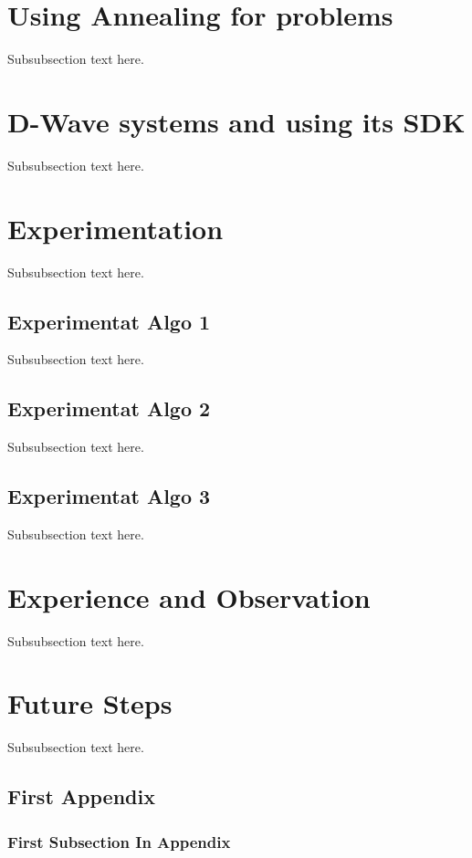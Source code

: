 \documentclass[12pt,conference]{IEEEtran}
\begin{document}
\section{Using Annealing for problems}
Subsubsection text here.

\section{D-Wave systems and using its SDK}
Subsubsection text here.

\section{Experimentation}
Subsubsection text here.

\subsection{Experimentat Algo 1}
Subsubsection text here.
\subsection{Experimentat Algo 2}
Subsubsection text here.
\subsection{Experimentat Algo 3}
Subsubsection text here.

\section{Experience and Observation}
Subsubsection text here.

\section{Future Steps}
Subsubsection text here.


\appendix

\subsection{First Appendix}
\label{FirstAppendix}

\subsubsection{First Subsection In Appendix}
\label{FirstSubsectionAppendix}


\end{document}

